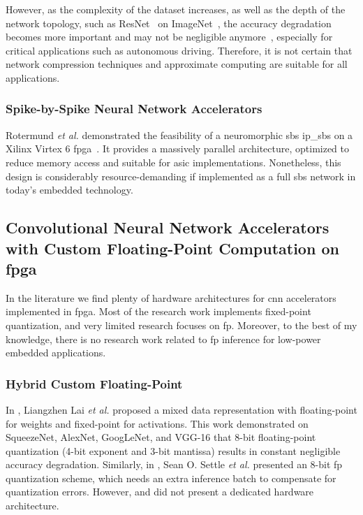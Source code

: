 However, as the complexity of the dataset increases, as well as the depth of the network topology, such as ResNet~\cite{he2016deep} on ImageNet~\cite{russakovsky2015imagenet}, the accuracy degradation becomes more important and may not be negligible anymore~\cite{rastegari2016xnor}, especially for critical applications such as autonomous driving. Therefore, it is not certain that network compression techniques and approximate computing are suitable for all applications.

\subsubsection{Spike-by-Spike Neural Network Accelerators}
Rotermund \textit{et al.} demonstrated the feasibility of a neuromorphic \gls{sbs} \gls{ip_sbs} on a Xilinx Virtex 6 \gls{fpga}~\cite{rotermund2018massively}. It provides a massively parallel architecture, optimized to reduce memory access and suitable for \gls{asic} implementations. Nonetheless, this design is considerably resource-demanding if implemented as a full \gls{sbs} network in today's embedded technology.

\subsection{Convolutional Neural Network Accelerators with Custom Floating-Point Computation on \gls{fpga}
}
\label{sec:related_work}
In the literature we find plenty of hardware architectures for \gls{cnn} accelerators implemented in \gls{fpga}. Most of the research work implements fixed-point quantization, and very limited research focuses on \gls{fp}. Moreover, to the best of my knowledge, there is no research work related to \gls{fp} inference for low-power embedded applications.


\subsubsection{Hybrid Custom Floating-Point}
In \cite{lai2017deep}, Liangzhen Lai \textit{et al.} proposed a mixed data representation with floating-point for weights and fixed-point for activations. This work demonstrated on SqueezeNet, AlexNet, GoogLeNet, and VGG-16 that 8-bit floating-point quantization (4-bit exponent and 3-bit mantissa) results in constant negligible accuracy degradation. Similarly, in \cite{settle2018quantizing}, Sean O. Settle \textit{et al.} presented an 8-bit \gls{fp} quantization scheme, which needs an extra inference batch to compensate for quantization errors. However, \cite{lai2017deep} and \cite{settle2018quantizing} did not present a dedicated hardware architecture.

